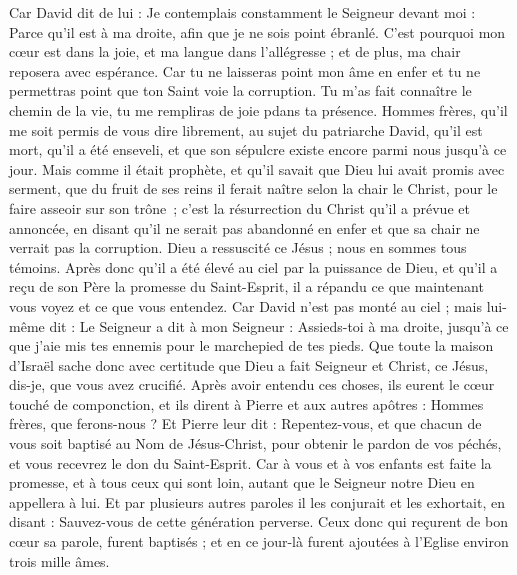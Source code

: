 \begin{multicols}{2}
Car David dit de lui : Je contemplais constamment le Seigneur devant moi : Parce qu’il est à ma droite, afin que je ne sois point ébranlé.
C'est pourquoi mon cœur est dans la joie, et ma langue dans l’allégresse ; et de plus, ma chair reposera avec espérance.
Car tu ne laisseras point mon âme en enfer et tu ne permettras point que ton Saint voie la corruption.
Tu m'as fait connaître le chemin de la vie, tu me rempliras de joie pdans ta présence.
Hommes frères, qu’il me soit permis de vous dire librement, au sujet du patriarche David, qu'il est mort, qu'il a été enseveli, et que son sépulcre existe encore parmi nous jusqu’à ce jour.
Mais comme il était prophète, et qu’il savait que Dieu lui avait promis avec serment, que du fruit de ses reins il ferait naître selon la chair le Christ, pour le faire asseoir sur son trône ;
c’est la résurrection du Christ qu’il a prévue et annoncée, en disant qu’il ne serait pas abandonné en enfer et que sa chair ne verrait pas la corruption.
Dieu a ressuscité ce Jésus ; nous en sommes tous témoins.
Après donc qu’il a été élevé au ciel  par la puissance de Dieu, et qu’il a reçu de son Père la promesse du Saint-Esprit, il a répandu ce que maintenant vous voyez et ce que vous entendez.
Car David n'est pas monté au ciel ; mais lui-même dit : Le Seigneur a dit à mon Seigneur : Assieds-toi à ma droite,
jusqu’à ce que j’aie mis tes ennemis pour le marchepied de tes pieds. 
Que toute la maison d'Israël sache donc avec certitude que Dieu a fait Seigneur et Christ, ce Jésus, dis-je, que vous avez crucifié.
Après avoir entendu ces choses, ils eurent le cœur touché de componction, et ils dirent à Pierre et aux autres apôtres : Hommes frères, que ferons-nous ?
Et Pierre leur dit : Repentez-vous, et que chacun de vous soit baptisé au Nom de Jésus-Christ, pour obtenir le pardon de vos péchés, et vous recevrez le don du Saint-Esprit.
Car à vous et à vos enfants est faite la promesse, et à tous ceux qui sont loin, autant que le Seigneur notre Dieu en appellera à lui.
Et par plusieurs autres paroles il les conjurait et les exhortait, en disant : Sauvez-vous de cette génération perverse.
Ceux donc qui reçurent de bon cœur sa parole, furent baptisés ; et en ce jour-là furent ajoutées à l'Eglise environ trois mille âmes.

\end{multicols}
